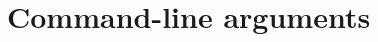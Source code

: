 %
%
%
%


\section{Command-line arguments}
\label{chap:CMD}
\renewcommand{\descriptionlabel}[1]{\textcolor{blue}{\texttt{#1}}}

